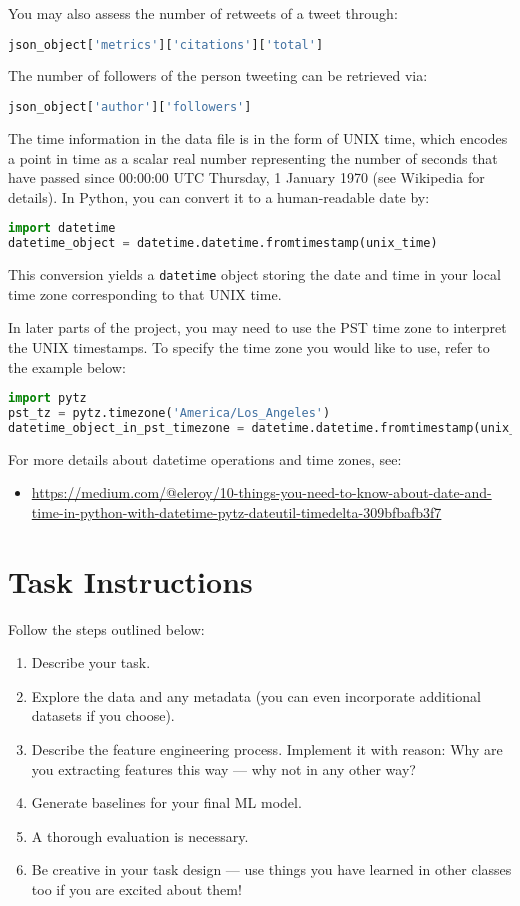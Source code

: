 \documentclass[12pt]{article}
\begin{document}
You may also assess the number of retweets of a tweet through:
\begin{lstlisting}[language=Python]
json_object['metrics']['citations']['total']
\end{lstlisting}

The number of followers of the person tweeting can be retrieved via:
\begin{lstlisting}[language=Python]
json_object['author']['followers']
\end{lstlisting}

The time information in the data file is in the form of UNIX time, which encodes a point in time as a scalar real number representing the number of seconds that have passed since 00:00:00 UTC Thursday, 1 January 1970 (see Wikipedia for details). In Python, you can convert it to a human-readable date by:
\begin{lstlisting}[language=Python]
import datetime
datetime_object = datetime.datetime.fromtimestamp(unix_time)
\end{lstlisting}
This conversion yields a \texttt{datetime} object storing the date and time in your local time zone corresponding to that UNIX time.

In later parts of the project, you may need to use the PST time zone to interpret the UNIX timestamps. To specify the time zone you would like to use, refer to the example below:
\begin{lstlisting}[language=Python]
import pytz
pst_tz = pytz.timezone('America/Los_Angeles')
datetime_object_in_pst_timezone = datetime.datetime.fromtimestamp(unix_time, pst_tz)
\end{lstlisting}
For more details about datetime operations and time zones, see:
\begin{itemize}
    \item \url{https://medium.com/@eleroy/10-things-you-need-to-know-about-date-and-time-in-python-with-datetime-pytz-dateutil-timedelta-309bfbafb3f7}
\end{itemize}

\section{Task Instructions}

Follow the steps outlined below:
\begin{enumerate}
    \item Describe your task.
    \item Explore the data and any metadata (you can even incorporate additional datasets if you choose).
    \item Describe the feature engineering process. Implement it with reason: Why are you extracting features this way --- why not in any other way?
    \item Generate baselines for your final ML model.
    \item A thorough evaluation is necessary.
    \item Be creative in your task design --- use things you have learned in other classes too if you are excited about them!
\end{enumerate}
\end{document}

